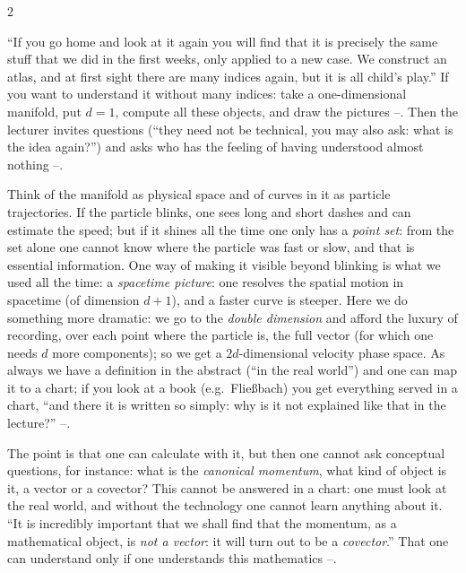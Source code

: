 \begin{paracol}{2}
\begin{coursenote}\label{cn:lag-practise}
``If you go home and look at it again you will find that it is precisely the same stuff that we did in the first weeks, only applied to a new case. We construct an atlas, and at first sight there are many indices again, but it is all child's play.'' If you want to understand it without many indices: take a one-dimensional manifold, put $d=1$, compute all these objects, and draw the pictures --. Then the lecturer invites questions (``they need not be technical, you may also ask: what is the idea again?'') and asks who has the feeling of having understood almost nothing --.
\end{coursenote}

\begin{intuition}\label{int:lag-why}
Think of the manifold as physical space and of curves in it as particle trajectories. If the particle blinks, one sees long and short dashes and can estimate the speed; but if it shines all the time one only has a \emph{point set}: from the set alone one cannot know where the particle was fast or slow, and that is essential information. One way of making it visible beyond blinking is what we used all the time: a \emph{spacetime picture}: one resolves the spatial motion in spacetime (of dimension $d+1$), and a faster curve is steeper.
Here we do something more dramatic: we go to the \emph{double dimension} and afford the luxury of recording, over each point where the particle is, the full vector (for which one needs $d$ more components); so we get a $2d$-dimensional velocity phase space. As always we have a definition in the abstract (``in the real world'') and one can map it to a chart; if you look at a book (e.g.\ Flie{\ss}bach) you get everything served in a chart, ``and there it is written so simply: why is it not explained like that in the lecture?'' --.
\end{intuition}
The point is that one can calculate with it, but then one cannot ask conceptual questions, for instance: what is the \emph{canonical momentum}, what kind of object is it, a vector or a covector? This cannot be answered in a chart: one must look at the real world, and without the technology one cannot learn anything about it. ``It is incredibly important that we shall find that the momentum, as a mathematical object, is \emph{not a vector}: it will turn out to be a \emph{covector}.'' That one can understand only if one understands this mathematics --.


\end{paracol}
